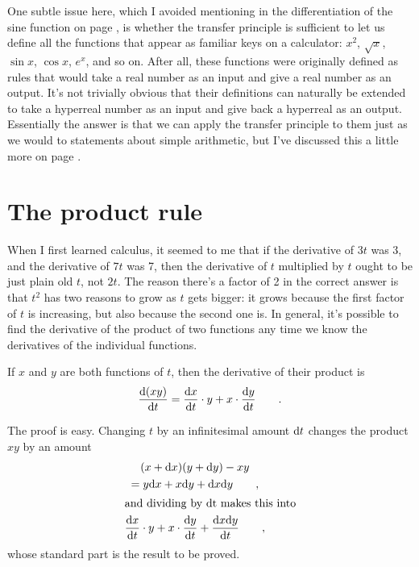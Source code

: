 \label{transcendentals}
One subtle issue here, which I avoided mentioning in the differentiation of the sine function on page \pageref{eg:derivative-of-sin},
is whether the transfer principle is sufficient to let us define all the functions that
appear as familiar keys on a calculator: $x^2$, $\sqrt{x}$, $\sin x$, $\cos x$, $e^x$, and so on.
After all, these functions were originally defined as rules that would take a real number as an input
and give a real number as an output. It's not trivially obvious that their definitions can naturally be extended
to take a hyperreal number as an input and give back a hyperreal as an output. Essentially the answer is that
we can apply the transfer principle to them just as we would to statements about simple arithmetic, but I've discussed
this a little more on page \pageref{detour:transcendentals}.

\section{The product rule}

When I first learned calculus, it seemed to me that if the derivative of $3t$ was $3$, and the derivative of
$7t$ was 7, then the derivative of $t$ multiplied by $t$ ought to be just plain old $t$, not $2t$. The reason there's
a factor of 2 in the correct answer is that $t^2$ has two reasons to grow as $t$ gets bigger: it grows because
the first factor of $t$ is increasing, but also because the second one is. In general, it's possible to find
the derivative of the product of two functions any time we know the derivatives of the individual functions.

\begin{important}
If $x$ and $y$ are both functions of $t$, then the derivative of their product is
\begin{equation*}
  \frac{\textup{d}(xy)}{\textup{d} t} = \frac{\textup{d} x}{\textup{d} t}\cdot y +  x \cdot \frac{\textup{d} y}{\textup{d} t} \qquad .
\end{equation*}
\end{important}

The proof is easy. Changing $t$ by an infinitesimal amount $\textup{d} t$ changes the product $xy$ by
an amount
\begin{gather*}
  (x+\textup{d} x)(y+\textup{d} y)-xy \\
      = y\textup{d} x + x\textup{d} y+\textup{d} x\textup{d} y \qquad , \\
\intertext{and dividing by \textup{d}t makes this into}
      \frac{\textup{d} x}{\textup{d} t}\cdot y +  x \cdot \frac{\textup{d} y}{\textup{d} t} + \frac{\textup{d} x \textup{d} y}{\textup{d} t} \qquad ,
\end{gather*}
whose standard part is the result to be proved.

